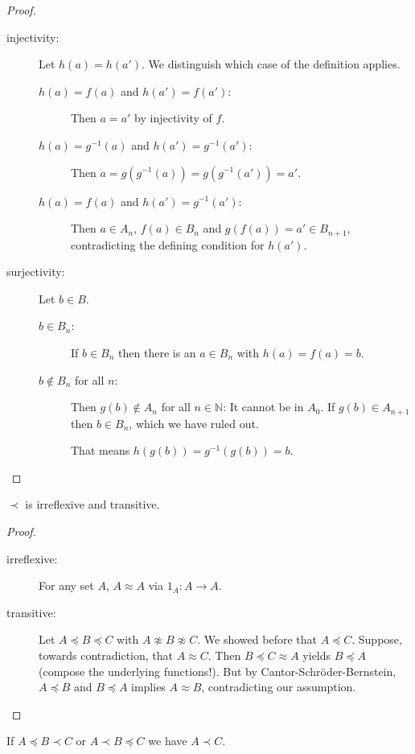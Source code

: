 \documentclass{whrartcl}
\newcommand{\NN}{\mathbb{N}}
\begin{document}
\begin{proof}
  \begin{description}
  \item[injectivity:] Let $h(a) = h(a')$. We distinguish which case of the
    definition applies.
    \begin{description}
    \item[$h(a) = f(a)$ and $h(a') = f(a')$:] Then $a = a'$ by injectivity of $f$.
    \item[$h(a) = g^{-1}(a)$ and $h(a') = g^{-1}(a')$:] Then $a = g(g^{-1}(a)) =
      g(g^{-1}(a')) = a'$.
    \item[$h(a) = f(a)$ and $h(a') = g^{-1}(a')$:] Then $a \in A_n$, $f(a) \in
      B_n$ and $g(f(a)) = a' \in B_{n+1}$, contradicting the defining condition
      for $h(a')$.
    \end{description}
  \item[surjectivity:] Let $b \in B$.
    \begin{description}
    \item[$b \in B_n$:] If $b \in B_n$ then there is an $a \in B_n$ with $h(a) = f(a) = b$.
    \item[$b \not\in B_n$ for all $n$:] Then $g(b) \not\in A_n$ for all $n \in
      \NN$: It cannot be in $A_0$. If $g(b) \in A_{n + 1}$ then $b \in B_n$,
      which we have ruled out.

      That means $h(g(b)) = g^{-1}(g(b)) = b$.
    \end{description}
  \end{description}
\end{proof}

\begin{lemma}
  $\prec$ is irreflexive and transitive.
\end{lemma}
\begin{proof}
  \
  \begin{description}
  \item[irreflexive:] For any set $A$, $A \approx A$ via $1_A : A \to A$.
  \item[transitive:] Let $A \preceq B \preceq C$ with $A \not\approx B \not\approx
    C$. We showed before that $A \preceq C$. Suppose, towards contradiction,
    that $A \approx C$. Then $B \preceq C \approx A$ yields $B \preceq A$ (compose
    the underlying functions!). But by Cantor-Schröder-Bernstein, $A \preceq B$
    and $B \preceq A$ implies $A \approx B$, contradicting our assumption.
  \end{description}
\end{proof}

\begin{corollary}
  If $A \preceq B \prec C$ or $A \prec B \preceq C$ we have $A \prec C$.
\end{corollary}
\end{document}
